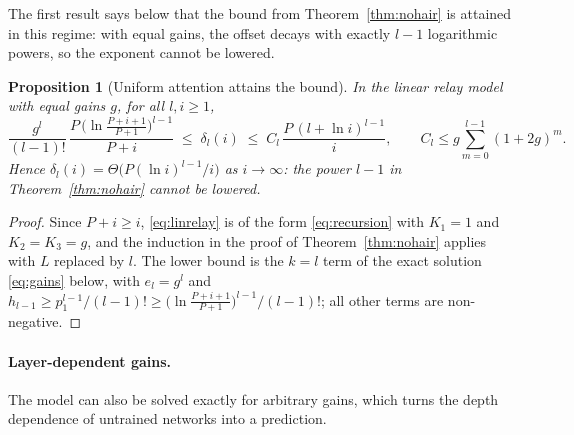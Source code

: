 \documentclass[11pt]{article}
\newtheorem{proposition}{Proposition}
\theoremstyle{definition}
\theoremstyle{remark}
\begin{document}
 The first result says below that the bound from Theorem~\ref{thm:nohair} is attained in this regime: with equal gains, the offset decays with exactly $l-1$ logarithmic powers, so the exponent cannot be lowered.

\begin{proposition}[Uniform attention attains the bound]\label{prop:tight}
In the linear relay model with equal gains $g$, for all $l,i\ge1$,
\begin{equation}\label{eq:tight}
  \frac{g^{l}}{(l-1)!}\,\frac{P\,\big(\ln\frac{P+i+1}{P+1}\big)^{l-1}}{P+i}\;\le\;\delta_l(i)\;\le\;C_l\,\frac{P\,(l+\ln i)^{l-1}}{i},
  \qquad C_l\le g\sum_{m=0}^{l-1}(1+2g)^m .
\end{equation}
Hence $\delta_l(i)=\Theta\big(P(\ln i)^{l-1}/i\big)$ as $i\to\infty$: the power $l-1$ in Theorem~\ref{thm:nohair} cannot be lowered.
\end{proposition}
\begin{proof}
Since $P+i\ge i$, \eqref{eq:linrelay} is of the form \eqref{eq:recursion} with $K_1=1$ and $K_2=K_3=g$, and the induction in the proof of Theorem~\ref{thm:nohair} applies with $L$ replaced by $l$. The lower bound is the $k=l$ term of the exact solution \eqref{eq:gains} below, with $e_l=g^l$ and $h_{l-1}\ge p_1^{l-1}/(l-1)!\ge\big(\ln\frac{P+i+1}{P+1}\big)^{l-1}/(l-1)!$; all other terms are non-negative.
\end{proof}

\paragraph{Layer-dependent gains.} The model can also be solved exactly for arbitrary gains, which turns the depth dependence of untrained networks into a prediction.
\end{document}

